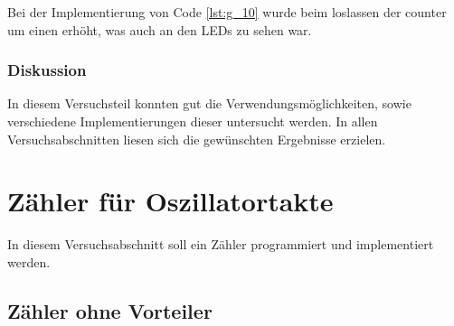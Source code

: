 \documentclass[12pt,a4paper]{article}
\begin{document}
Bei der Implementierung von Code \ref{lst:g_10} wurde beim loslassen der counter um einen erhöht, was auch an den LEDs zu sehen war.

\subsubsection*{Diskussion}

In diesem Versuchsteil konnten gut die Verwendungsmöglichkeiten, sowie verschiedene Implementierungen dieser untersucht werden. In allen Versuchsabschnitten liesen sich die gewünschten Ergebnisse erzielen.

\section{Zähler für Oszillatortakte}

In diesem Versuchsabschnitt soll ein Zähler programmiert und implementiert werden.

\subsection{Zähler ohne Vorteiler}
\end{document}
